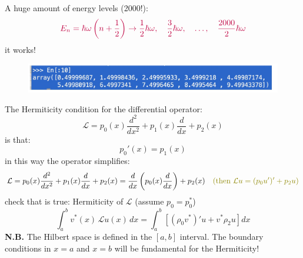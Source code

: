 \documentclass{article}
\begin{document}
\noindent
A huge amount of energy levels (2000!):
\begin{equation}
    \textcolor{purple}{
E_n = \hbar \omega \left(n + \frac{1}{2} \right)
\rightarrow 
\frac{1}{2} \hbar \omega, \quad \frac{3}{2} \hbar \omega, \quad \ldots, \quad \frac{2000}{2} \hbar \omega
}
\end{equation}
it works!
\begin{figure}[h]
    \centering
    \includegraphics[width=0.8\linewidth]{fig7.png}
\end{figure}

\noindent
The Hermiticity condition for the differential operator:
\begin{equation}
    \mathcal{L} = p_0(x) \frac{d^2}{dx^2} + p_1(x) \frac{d}{dx} + p_2(x)
\end{equation}
is that:
\begin{equation}
    p_0' (x) = p_1 (x)
\end{equation}
in this way the operator simplifies:
\begin{equation}
    \mathcal{L} = p_0(x) \frac{d^2}{dx^2} + p_1(x) \frac{d}{dx} + p_2(x) = \frac{d}{dx}\left( p_0 (x) \frac{d}{dx} \right) + p_2 (x) \quad \color{olive} (\text{then } \mathcal{L}u = (p_0 u')' + p_2u) \color{black}
\end{equation}
check that is true: Hermiticity of $\mathcal{L}$ (assume $p_0 = p_0 ^*$)
\begin{equation}
    \int_a^b v^*(x)\, \mathcal{L}u(x)\, dx
= \int_a^b \left[ (\rho_0 v^*)' u + v^* \rho_2 u \right] dx
\end{equation}
\textbf{N.B. }The Hilbert space is defined in the $[a,b]$ interval. The boundary conditions in $x=a$ and $x=b$ will be fundamental for the Hermiticity!
\end{document}
